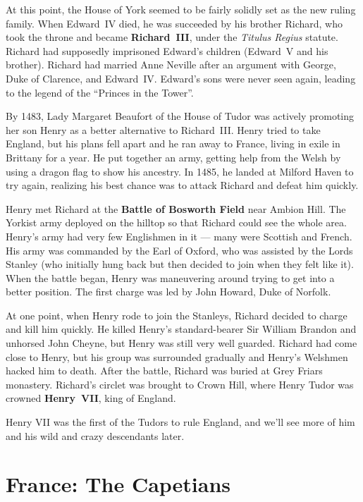 At this point, the House of York seemed to be fairly solidly set as the new ruling family.
When Edward~IV died, he was succeeded by his brother Richard,
who took the throne and became \textbf{Richard~III}, under the \textit{Titulus Regius} statute.
Richard had supposedly imprisoned Edward's children (Edward~V and his brother).
Richard had married Anne Neville after an argument with George, Duke of Clarence, and Edward~IV\@.
Edward's sons were never seen again, leading to the legend of the ``Princes in the Tower''.

By 1483, Lady Margaret Beaufort of the House of Tudor was actively promoting her son Henry
as a better alternative to Richard~III\@.
Henry tried to take England, but his plans fell apart and he ran away to France,
living in exile in Brittany for a year.
He put together an army, getting help from the Welsh by using a dragon flag to show his ancestry.
In 1485, he landed at Milford Haven to try again,
realizing his best chance was to attack Richard and defeat him quickly.

Henry met Richard at the \textbf{Battle of Bosworth Field} near Ambion Hill.
The Yorkist army deployed on the hilltop so that Richard could see the whole area.
Henry's army had very few Englishmen in it --- many were Scottish and French.
His army was commanded by the Earl of Oxford, who was assisted by the Lords Stanley
(who initially hung back but then decided to join when they felt like it).
When the battle began, Henry was maneuvering around trying to get into a better position.
The first charge was led by John Howard, Duke of Norfolk.

At one point, when Henry rode to join the Stanleys, Richard decided to charge and kill him quickly.
He killed Henry's standard-bearer Sir William Brandon and unhorsed John Cheyne,
but Henry was still very well guarded.
Richard had come close to Henry, but his group was surrounded gradually and Henry's Welshmen hacked him to death.
After the battle, Richard was buried at Grey Friars monastery.
Richard's circlet was brought to Crown Hill, where Henry Tudor was crowned \textbf{Henry~VII}, king of England.

Henry VII was the first of the Tudors to rule England,
and we'll see more of him and his wild and crazy descendants later.

\section{France: The Capetians}

